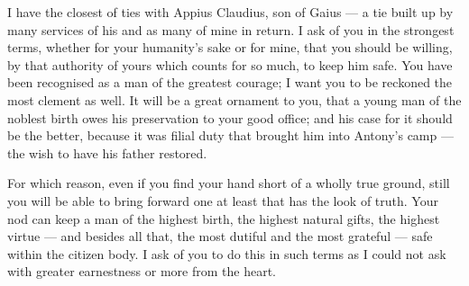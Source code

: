 

 I have the closest of ties with Appius Claudius, son of Gaius --- a tie built up by many services of his and as many of mine in return. I ask of you in the strongest terms, whether for your humanity's sake or for mine, that you should be willing, by that authority of yours which counts for so much, to keep him safe. You have been recognised as a man of the greatest courage; I want you to be reckoned the most clement as well. It will be a great ornament to you, that a young man of the noblest birth owes his preservation to your good office; and his case for it should be the better, because it was filial duty that brought him into Antony's camp --- the wish to have his father restored.

 For which reason, even if you find your hand short of a wholly true ground, still you will be able to bring forward one at least that has the look of truth. Your nod can keep a man of the highest birth, the highest natural gifts, the highest virtue --- and besides all that, the most dutiful and the most grateful --- safe within the citizen body. I ask of you to do this in such terms as I could not ask with greater earnestness or more from the heart.
